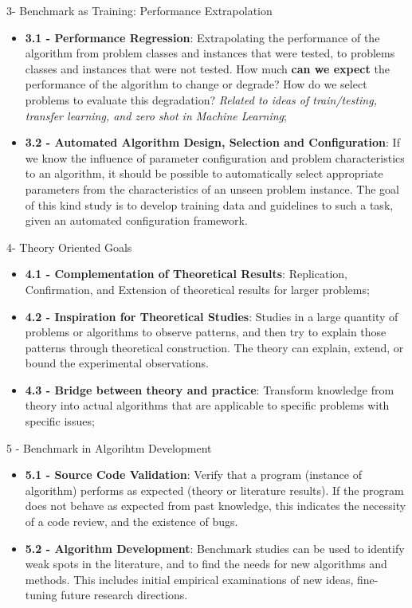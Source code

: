 \documentclass[aspectratio=169]{beamer}
\begin{document}
\begin{frame}{3- Benchmark as Training: Performance Extrapolation}
  \begin{itemize}
    \item {\bf 3.1 - Performance Regression}: Extrapolating the performance of the algorithm from problem classes and instances that were tested, to problems classes and instances that were not tested. How much {\bf can we expect} the performance of the algorithm to change or degrade? How do we select problems to evaluate this degradation? \emph{Related to ideas of train/testing, transfer learning, and zero shot in Machine Learning}; \bigskip
    
    \item {\bf 3.2 - Automated Algorithm Design, Selection and Configuration}: If we know the influence of parameter configuration and problem characteristics to an algorithm, it should be possible to automatically select appropriate parameters from the characteristics of an unseen problem instance. The goal of this kind study is to develop training data and guidelines to such a task, given an automated configuration framework.
  \end{itemize}
\end{frame}

\begin{frame}{4- Theory Oriented Goals}
  \begin{itemize}
    \item {\bf 4.1 - Complementation of Theoretical Results}: Replication, Confirmation, and Extension of theoretical results for larger problems;
    \item {\bf 4.2 - Inspiration for Theoretical Studies}: Studies in a large quantity of problems or algorithms to observe patterns, and then try to explain those patterns through theoretical construction. The theory can explain, extend, or bound the experimental observations.
    \item {\bf 4.3 - Bridge between theory and practice}: Transform knowledge from theory into actual algorithms that are applicable to specific problems with specific issues;
  \end{itemize}
\end{frame}

\begin{frame}{5 - Benchmark in Algorihtm Development}
  \begin{itemize}
    \item {\bf 5.1 - Source Code Validation}: Verify that a program (instance of algorithm) performs as expected (theory or literature results). If the program does not behave as expected from past knowledge, this indicates the necessity of a code review, and the existence of bugs.\medskip 
    
    \item {\bf 5.2 - Algorithm Development}: Benchmark studies can be used to identify weak spots in the literature, and to find the needs for new algorithms and methods. This includes initial empirical examinations of new ideas, fine-tuning future research directions.
  \end{itemize}
  \bigskip
  
\end{frame}
\end{document}
